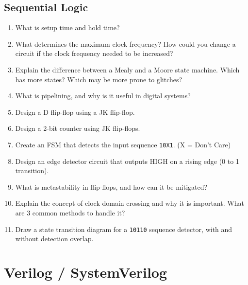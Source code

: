 \documentclass[11pt]{article}
\begin{document}
\subsection{Sequential Logic}
\begin{enumerate}
    \item What is setup time and hold time?
    \item What determines the maximum clock frequency? How could you change a
    circuit if the clock frequency needed to be increased?
    \item Explain the difference between a Mealy and a Moore state machine.
    Which has more states? Which may be more prone to glitches?
    \item What is pipelining, and why is it useful in digital systems?
    \item Design a D flip-flop using a JK flip-flop.
    \item Design a 2-bit counter using JK flip-flops.
    \item Create an FSM that detects the input sequence \texttt{10X1}. (X =
    Don't Care)
    \item Design an edge detector circuit that outputs HIGH on a rising edge (0
    to 1 transition).
    \item What is metastability in flip-flops, and how can it be mitigated?
    \item Explain the concept of clock domain crossing and why it is important.
    What are 3 common methods to handle it?
    \item Draw a state transition diagram for a \texttt{10110} sequence detector, with
    and without detection overlap.
\end{enumerate}

\section{Verilog / SystemVerilog}
\end{document}
